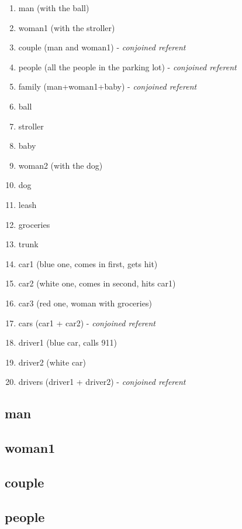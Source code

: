 \documentclass[
]{book}
\providecommand{\tightlist}{%
  \setlength{\itemsep}{0pt}\setlength{\parskip}{0pt}}
\begin{document}
\begin{enumerate}
\def\labelenumi{\arabic{enumi}.}
\tightlist
\item
  man (with the ball)
\item
  woman1 (with the stroller)
\item
  couple (man and woman1) - \emph{conjoined referent}
\item
  people (all the people in the parking lot) - \emph{conjoined referent}
\item
  family (man+woman1+baby) - \emph{conjoined referent}
\item
  ball
\item
  stroller
\item
  baby
\item
  woman2 (with the dog)
\item
  dog
\item
  leash
\item
  groceries
\item
  trunk
\item
  car1 (blue one, comes in first, gets hit)
\item
  car2 (white one, comes in second, hits car1)
\item
  car3 (red one, woman with groceries)
\item
  cars (car1 + car2) - \emph{conjoined referent}
\item
  driver1 (blue car, calls 911)
\item
  driver2 (white car)
\item
  drivers (driver1 + driver2) - \emph{conjoined referent}
\end{enumerate}

\hypertarget{man}{%
\subsection{man}\label{man}}

\hypertarget{woman1}{%
\subsection{woman1}\label{woman1}}

\hypertarget{couple}{%
\subsection{couple}\label{couple}}

\hypertarget{people}{%
\subsection{people}\label{people}}
\end{document}
